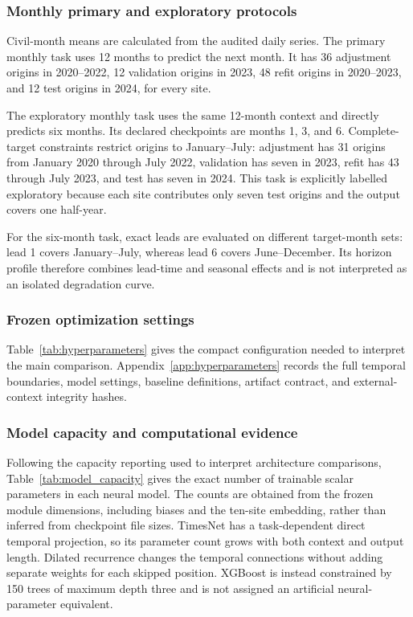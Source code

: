 \subsubsection{Monthly primary and exploratory protocols}

Civil-month means are calculated from the audited daily series. The primary
monthly task uses 12 months to predict the next month. It has 36 adjustment
origins in 2020--2022, 12 validation origins in 2023, 48 refit origins in
2020--2023, and 12 test origins in 2024, for every site.

The exploratory monthly task uses the same 12-month context and directly
predicts six months. Its declared checkpoints are months 1, 3, and 6.
Complete-target constraints restrict origins to January--July: adjustment has
31 origins from January 2020 through July 2022, validation has seven in 2023,
refit has 43 through July 2023, and test has seven in 2024. This task is
explicitly labelled exploratory because each site contributes only seven test
origins and the output covers one half-year.

For the six-month task, exact leads are evaluated on different target-month
sets: lead 1 covers January--July, whereas lead 6 covers June--December. Its
horizon profile therefore combines lead-time and seasonal effects and is not
interpreted as an isolated degradation curve.

\subsubsection{Frozen optimization settings}

Table~\ref{tab:hyperparameters} gives the compact configuration needed to
interpret the main comparison. Appendix~\ref{app:hyperparameters} records the
full temporal boundaries, model settings, baseline definitions, artifact
contract, and external-context integrity hashes.



\subsubsection{Model capacity and computational evidence}

Following the capacity reporting used to interpret architecture comparisons,
Table~\ref{tab:model_capacity} gives the exact number of trainable scalar
parameters in each neural model. The counts are obtained from the frozen module
dimensions, including biases and the ten-site embedding, rather than inferred
from checkpoint file sizes. TimesNet has a task-dependent direct temporal
projection, so its parameter count grows with both context and output length.
Dilated recurrence changes the temporal connections without adding separate
weights for each skipped position. XGBoost is instead constrained by 150 trees
of maximum depth three and is not assigned an artificial neural-parameter
equivalent.

